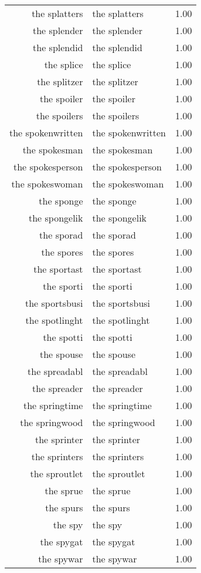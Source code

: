 \begin{table}[ht]
\begin{tabular}{rlr}
  the splatters & the splatters & 1.00 \\ 
  the splender & the splender & 1.00 \\ 
  the splendid & the splendid & 1.00 \\ 
  the splice & the splice & 1.00 \\ 
  the splitzer & the splitzer & 1.00 \\ 
  the spoiler & the spoiler & 1.00 \\ 
  the spoilers & the spoilers & 1.00 \\ 
  the spokenwritten & the spokenwritten & 1.00 \\ 
  the spokesman & the spokesman & 1.00 \\ 
  the spokesperson & the spokesperson & 1.00 \\ 
  the spokeswoman & the spokeswoman & 1.00 \\ 
  the sponge & the sponge & 1.00 \\ 
  the spongelik & the spongelik & 1.00 \\ 
  the sporad & the sporad & 1.00 \\ 
  the spores & the spores & 1.00 \\ 
  the sportast & the sportast & 1.00 \\ 
  the sporti & the sporti & 1.00 \\ 
  the sportsbusi & the sportsbusi & 1.00 \\ 
  the spotlinght & the spotlinght & 1.00 \\ 
  the spotti & the spotti & 1.00 \\ 
  the spouse & the spouse & 1.00 \\ 
  the spreadabl & the spreadabl & 1.00 \\ 
  the spreader & the spreader & 1.00 \\ 
  the springtime & the springtime & 1.00 \\ 
  the springwood & the springwood & 1.00 \\ 
  the sprinter & the sprinter & 1.00 \\ 
  the sprinters & the sprinters & 1.00 \\ 
  the sproutlet & the sproutlet & 1.00 \\ 
  the sprue & the sprue & 1.00 \\ 
  the spurs & the spurs & 1.00 \\ 
  the spy & the spy & 1.00 \\ 
  the spygat & the spygat & 1.00 \\ 
  the spywar & the spywar & 1.00 \\ 

\end{tabular}
\end{table}
